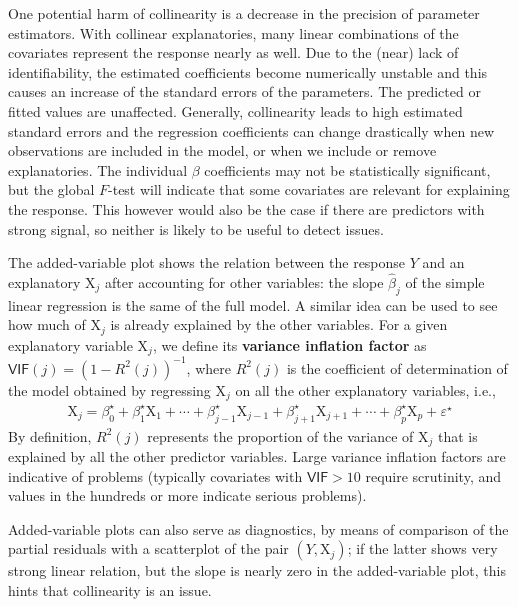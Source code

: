 \documentclass[
  11pt,
  letterpaper,
]{book}
\theoremstyle{definition}
\theoremstyle{definition}
\theoremstyle{definition}
\theoremstyle{remark}
\begin{document}
One potential harm of collinearity is a decrease in the precision of parameter estimators. With collinear explanatories, many linear combinations of the covariates represent the response nearly as well. Due to the (near) lack of identifiability, the estimated coefficients become numerically unstable and this causes an increase of the standard errors of the parameters. The predicted or fitted values are unaffected. Generally, collinearity leads to high estimated standard errors and the regression coefficients can change drastically when new observations are included in the model, or when we include or remove explanatories. The individual \(\beta\) coefficients may not be statistically significant, but the global \(F\)-test will indicate that some covariates are relevant for explaining the response. This however would also be the case if there are predictors with strong signal, so neither is likely to be useful to detect issues.

The added-variable plot shows the relation between the response \(Y\) and an explanatory \(\mathrm{X}_j\) after accounting for other variables: the slope \(\widehat{\beta}_j\) of the simple linear regression is the same of the full model. A similar idea can be used to see how much of \(\mathrm{X}_j\) is already explained by the other variables. For a given explanatory variable \(\mathrm{X}_j\), we define its \textbf{variance inflation factor} as \(\mathsf{VIF}(j)=(1-R^2(j))^{-1}\), where \(R^2(j)\) is the coefficient of determination of the model obtained by regressing \(\mathrm{X}_j\) on all the other explanatory variables, i.e.,
\begin{align*}
\mathrm{X}_j = \beta^{\star}_0 + \beta^{\star}_1 \mathrm{X}_1 + \cdots + \beta^{\star}_{j-1} \mathrm{X}_{j-1} + \beta^{\star}_{j+1} \mathrm{X}_{j+1} + \cdots + \beta^{\star}_p\mathrm{X}_p + \varepsilon^{\star}
\end{align*}
By definition, \(R^2(j)\) represents the proportion of the variance of \(\mathrm{X}_j\) that is explained by all the other predictor variables. Large variance inflation factors are indicative of problems (typically covariates with \(\mathsf{VIF}>10\) require scrutinity, and values in the hundreds or more indicate serious problems).

Added-variable plots can also serve as diagnostics, by means of comparison of the partial residuals with a scatterplot of the pair \((Y, \mathrm{X}_j)\); if the latter shows very strong linear relation, but the slope is nearly zero in the added-variable plot, this hints that collinearity is an issue.
\end{document}
